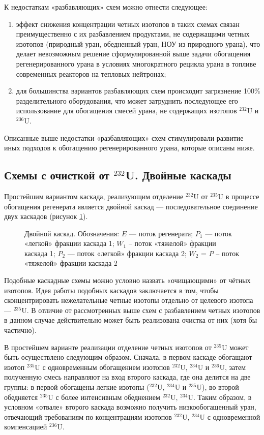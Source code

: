 К недостаткам «разбавляющих» схем можно отнести следующее:

\begin{enumerate}
  \item	эффект снижения концентрации четных изотопов в таких схемах связан преимущественно с их разбавлением продуктами, не содержащими четных изотопов (природный уран, обедненный уран, НОУ из природного урана), что делает невозможным решение сформулированной выше задачи обогащения регенерированного урана в условиях многократного рецикла урана в топливе современных реакторов на тепловых нейтронах;
  \item	 для большинства вариантов разбавляющих схем происходит загрязнение 100\% разделительного оборудования, что может затруднить последующее его использование для обогащения смесей урана, не содержащих изотопов $^{232}$U и $^{236}$U.
\end{enumerate}

Описанные выше недостатки «разбавляющих» схем стимулировали развитие иных подходов к обогащению регенерированного урана, которые описаны ниже.


\subsection{Схемы с очисткой от $^{232}$U. Двойные каскады}\label{ch1/dvoynoy}

Простейшим вариантом каскада, реализующим отделение $^{232}$U от $^{235}$U в процессе обогащения регенерата является двойной каскад --- последовательное соединение двух каскадов (рисунок \ref{fig:double_ru}). 

\begin{figure}[ht]
  \caption{Двойной каскад. Обозначения: $E$ --- поток регенерата; $P_1$ --- поток «легкой» фракции каскада 1; $W_1$ – поток «тяжелой» фракции каскада 1; $P_2$ --- поток «легкой» фракции каскада 2; $W_2$ = $P$ – поток «тяжелой» фракции каскада 2}\label{fig:double_ru}
\end{figure}

Подобные каскадные схемы можно условно назвать «очищающими» от чётных изотопов. Идея работы подобных каскадов заключается в том, чтобы сконцентрировать нежелательные четные изотопы отдельно от целевого изотопа --- $^{235}$U. В отличие от рассмотренных выше схем с разбавлением четных изотопов в данном случае действительно может быть реализована очистка от них (хотя бы частично).

В простейшем варианте  реализации отделение четных изотопов от $^{235}$U может быть осуществлено следующим образом. Сначала, в первом каскаде обогащают изотоп $^{235}$U с одновременным обогащением изотопов $^{232}$U, $^{234}$U и $^{236}$U, затем полученную смесь направляют на вход второго каскада, где она делится на две группы: в первой обогащены легкие изотопы ($^{232}$U, $^{234}$U и $^{235}$U), во второй обедняется $^{235}$U с более интенсивным обеднением $^{232}$U, $^{234}$U. Таким образом, в условном «отвале» второго каскада возможно получить низкообогащенный уран, отвечающий требованиям по концентрациям изотопов $^{232}$U, $^{234}$U с одновременной компенсацией $^{236}$U.

